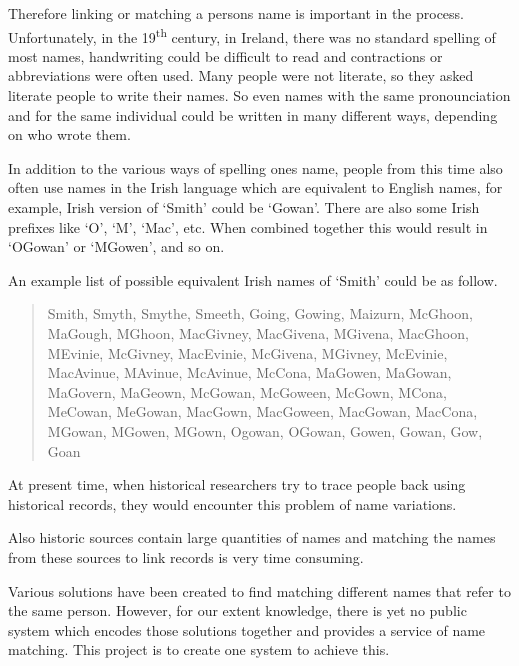 Therefore linking or matching a person\textquotesingle s name is important in the process.
Unfortunately, in the 19\textsuperscript{th} century, in Ireland, there was no standard
spelling of most names, handwriting could be difficult to read
and contractions or abbreviations were often used. Many people were not literate,
so they asked literate people to write their names.
So even names with the same pronounciation and for the same individual
could be written in many different ways, depending on who wrote them.

In addition to the various ways of spelling one\textquotesingle s name,
people from this time also often use names in the Irish language
which are equivalent to English names,
for example, Irish version of `Smith' could be `Gowan'.
There are also some Irish prefixes like `O\textquotesingle', `M\textquotesingle', `Mac',
etc. When combined together this would result in `O\textquotesingle Gowan' or
`M\textquotesingle Gowen', and so on.

An example list of possible equivalent Irish names of `Smith'
could be as follow.

\begin{quotation} \noindent
Smith, Smyth, Smythe, Smeeth, Going, Gowing, Maizurn, McGhoon, MaGough,
M\textquotesingle Ghoon, MacGivney, MacGivena, M\textquotesingle Givena,
MacGhoon, M\textquotesingle Evinie, McGivney, MacEvinie, McGivena,
M\textquotesingle Givney, McEvinie, MacAvinue, M\textquotesingle Avinue,
McAvinue, McCona, MaGowen, MaGowan, MaGovern, MaGeown, McGowan, McGoween,
McGown, M\textquotesingle Cona, MeCowan, MeGowan, MacGown, MacGoween,
MacGowan, MacCona, M\textquotesingle Gowan, M\textquotesingle Gowen,
M\textquotesingle Gown, Ogowan, O\textquotesingle Gowan, Gowen,
Gowan, Gow, Goan
\end{quotation}

At present time, when historical researchers try to trace people back
using historical records, they would encounter this problem of
name variations.

Also historic sources contain large quantities of names and
matching the names from these sources to link records is
very time consuming.

Various solutions have been created to find
matching different names that refer to the same person. However,
for our extent knowledge, there is yet no public system which encodes
those solutions together and provides a service of name matching.
This project is to create one system to achieve this.

